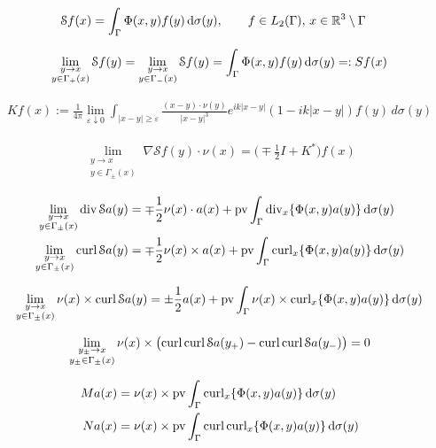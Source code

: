 \begin{align*}
  \mathcal{S}f(x) &= \int_{\Gamma}\Phi(x,y)f(y)\,\text{d}\sigma(y), \qquad f\in L_2(\Gamma),\, x\in\mathbb{R}^3\setminus\Gamma 
\end{align*}

\begin{align*}
  \lim_{\substack{y\to x\\y\in\Gamma_+(x)}}\mathcal{S}f(y)=
  \lim_{\substack{y\to x\\y\in\Gamma_-(x)}}\mathcal{S}f(y)=
  \int_{\Gamma}\Phi(x,y)f(y)\,\text{d}\sigma(y)=:Sf(x)
\end{align*}

\begin{align*}
  Kf(x):=\frac{1}{4\pi}\lim_{\varepsilon\downarrow 0}\int_{|x-y|\geqslant
         \varepsilon}\frac{(x-y)\cdot\nu(y)}{|x-y|^3}e^{ik|x-y|}(1-ik|x-y|)f(y)
         \,d\sigma(y)
\end{align*}

\begin{align*}
  \lim_{\substack{y\to x\\y\in\Gamma_{\pm}(x)}}\nabla\mathcal{S}f(y)
  \cdot\nu(x)=\bigl(\mp\frac{1}{2}I+K^*\bigr)f(x)
\end{align*}
  
\begin{align*}
  \lim_{\substack{y\to x\\y\in\Gamma_{\pm}(x)}}\operatorname{div} \mathcal{S}a(y) &= 
  \mp\frac{1}{2}\nu(x)\cdot a(x)+\operatorname{pv}\int_{\Gamma}\operatorname{div}_x\{\Phi(x,y)a(y)\}\,\text{d}\sigma(y)\\
  \lim_{\substack{y\to x\\y\in\Gamma_{\pm}(x)}}\operatorname{curl} \mathcal{S}a(y) &= 
  \mp\frac{1}{2}\nu(x)\times a(x)+\operatorname{pv}\int_{\Gamma}\operatorname{curl}_x\{\Phi(x,y)a(y)\}\,\text{d}\sigma(y)
\end{align*}

\begin{align*}
  \lim_{\substack{y\to x\\y\in\Gamma_{\pm}(x)}}\nu(x)\times\operatorname{curl}\mathcal{S}
  a(y) =\pm\frac{1}{2}a(x)+\operatorname{pv}\int_{\Gamma}\nu(x)\times\operatorname{curl}_x\{\Phi(x,y)a(y)\}\,\text{d}\sigma(y)
\end{align*}

\begin{align*}
  \lim_{\substack{y_{\pm}\to x\\y_{\pm}\in\Gamma_{\pm}(x)}}\nu(x)\times
  \bigl(\operatorname{curl}\operatorname{curl}\mathcal{S}a(y_+)-\operatorname{curl}\operatorname{curl}\mathcal{S}a(y_-)\bigr)=0 
\end{align*}

\begin{align*}
  Ma(x) &= \nu(x)\times\operatorname{pv}\int_{\Gamma}\operatorname{curl}_x\{\Phi(x,y)a(y)\}\,\text{d}\sigma(y)\\
  Na(x) &= \nu(x)\times\operatorname{pv}\int_{\Gamma}\operatorname{curl}\operatorname{curl}_x\{\Phi(x,y)a(y)\}\,\text{d}\sigma(y)
\end{align*}

